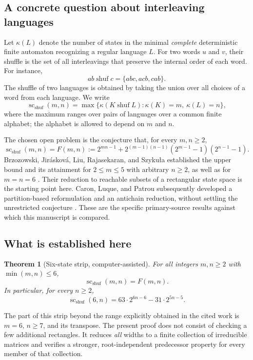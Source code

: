 \documentclass[11pt,letterpaper]{article}
\numberwithin{equation}{section}
\newtheorem{theorem}{Theorem}[section]
\theoremstyle{definition}
\theoremstyle{remark}
\newcommand{\shuf}{\mathbin{\operatorname{shuf}}}
\newcommand{\scf}{\operatorname{sc}_{\mathrm{shuf}}}
\begin{document}
\subsection{A concrete question about interleaving languages}
Let $\kappa(L)$ denote the number of states in the minimal \emph{complete}
deterministic finite automaton recognizing a regular language $L$. For two
words $u$ and $v$, their shuffle is the set of all interleavings that preserve
the internal order of each word. For instance,
\[
 ab\shuf c=\{abc,acb,cab\}.
\]
The shuffle of two languages is obtained by taking the union over all choices
of a word from each language. We write
\[
 \scf(m,n)=\max\{\kappa(K\shuf L):\kappa(K)=m,\ \kappa(L)=n\},
\]
where the maximum ranges over pairs of languages over a common finite
alphabet; the alphabet is allowed to depend on $m$ and $n$.

The chosen open problem is the conjecture that, for every $m,n\ge2$,
\begin{equation}\label{eq:conjectured-bound}
 \scf(m,n)=F(m,n):=
 2^{mn-1}+2^{(m-1)(n-1)}(2^{m-1}-1)(2^{n-1}-1).
\end{equation}
Brzozowski, Jir\'askov\'a, Liu, Rajasekaran, and Szyku\l a established the
upper bound and its attainment for $2\le m\le5$ with arbitrary $n\ge2$, as
well as for $m=n=6$ \cite{BJLRS2016}. Their reduction to reachable subsets of
a rectangular state space is the starting point here. Caron, Luque, and
Patrou subsequently developed a partition-based reformulation and an
antichain reduction, without settling the unrestricted conjecture
\cite{CLP2020}. These are the specific primary-source results against which
this manuscript is compared.

\subsection{What is established here}
\begin{theorem}[Six-state strip, computer-assisted]\label{thm:main}
For all integers $m,n\ge2$ with $\min(m,n)\le6$,
\[
 \scf(m,n)=F(m,n).
\]
In particular, for every $n\ge2$,
\begin{equation}\label{eq:six-simplified}
 \scf(6,n)=63\cdot2^{6n-6}-31\cdot2^{5n-5}.
\end{equation}
\end{theorem}

The part of this strip beyond the range explicitly obtained in the cited
work is $m=6$, $n\ge7$, and its transpose. The present proof does not consist
of checking a few additional rectangles. It reduces \emph{all} widths to a
finite collection of irreducible matrices and verifies a stronger,
root-independent predecessor property for every member of that collection.
\end{document}
